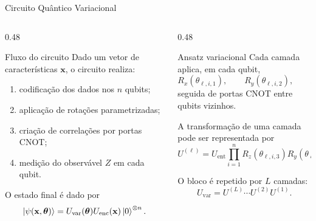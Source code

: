 \begin{frame}[shrink=12]{Circuito Quântico Variacional}

\begin{columns}[T,onlytextwidth]

\begin{column}{0.48\textwidth}
\vspace{0.65cm}
\begin{block}{Fluxo do circuito}
Dado um vetor de características $\mathbf{x}$, o circuito realiza:

\begin{enumerate}
  \item codificação dos dados nos $n$ qubits;
  \item aplicação de rotações parametrizadas;
  \item criação de correlações por portas CNOT;
  \item medição do observável $Z$ em cada qubit.
\end{enumerate}

O estado final é dado por
\[
  \ket{\psi(\mathbf{x},\boldsymbol{\theta})}
  =
  U_{\mathrm{var}}(\boldsymbol{\theta})
  U_{\mathrm{enc}}(\mathbf{x})
  \ket{0}^{\otimes n}.
\]
\end{block}

\end{column}

\begin{column}{0.48\textwidth}

\begin{block}{Ansatz variacional}
Cada camada aplica, em cada qubit,
\[
  R_x(\theta_{\ell,i,1}),
  \qquad
  R_y(\theta_{\ell,i,2}),
  \qquad
  R_z(\theta_{\ell,i,3}),
\]
seguida de portas CNOT entre qubits vizinhos.

A transformação de uma camada pode ser representada por
\[
  U^{(\ell)}
  =
  U_{\mathrm{ent}}
  \prod_{i=1}^{n}
  R_z(\theta_{\ell,i,3})
  R_y(\theta_{\ell,i,2})
  R_x(\theta_{\ell,i,1}).
\]

O bloco é repetido por $L$ camadas:
\[
  U_{\mathrm{var}}
  =
  U^{(L)}\cdots U^{(2)}U^{(1)}.
\]
\end{block}


\end{column}

\end{columns}

\end{frame}

